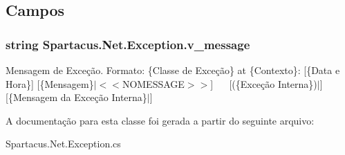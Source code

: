 \subsection{Campos}
\hypertarget{classSpartacus_1_1Net_1_1Exception_af4f1c80be90dce64749fb1397ff25aef}{
\subsubsection[{v\+\_\+message}]{\setlength{\rightskip}{0pt plus 5cm}string Spartacus.\+Net.\+Exception.\+v\+\_\+message}}\label{classSpartacus_1_1Net_1_1Exception_af4f1c80be90dce64749fb1397ff25aef}


Mensagem de Exceção. Formato\+: \{Classe de Exceção\} at \{Contexto\}\+: \mbox{[}\{Data e Hora\}\mbox{]} \mbox{[}\{Mensagem\}$\vert$$<$$<$\+N\+O\+M\+E\+S\+S\+A\+G\+E$>$$>$\mbox{]}~\newline
~\newline
 \mbox{[}(\{Exceção Interna\})$\vert$\mbox{]} \mbox{[}\{Mensagem da Exceção Interna\}$\vert$\mbox{]} 



A documentação para esta classe foi gerada a partir do seguinte arquivo\+:\begin{DoxyCompactItemize}
\item 
Spartacus.\+Net.\+Exception.\+cs\end{DoxyCompactItemize}

